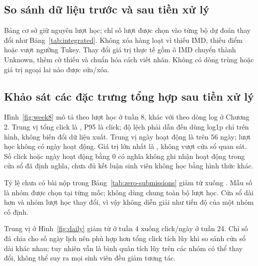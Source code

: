 \subsection{So sánh dữ liệu trước và sau tiền xử lý}
Bảng cơ sở giữ nguyên \NEnrollments{} lượt học; chỉ số lượt được chọn vào từng bộ dự đoán thay đổi như Bảng~\ref{tab:integrated}. Không xóa hàng loạt vì thiếu IMD, thiếu điểm hoặc vượt ngưỡng Tukey. Thay đổi giá trị thực tế gồm \NImdUnknown{} ô IMD chuyển thành Unknown, thêm cờ thiếu và chuẩn hóa \NImdLabels{} cách viết nhãn. Không có dòng trùng hoặc giá trị ngoại lai nào được sửa/xóa.

\subsection{Khảo sát các đặc trưng tổng hợp sau tiền xử lý}
Hình~\ref{fig:week8} mô tả theo lượt học ở tuần 8, khác với  theo dòng log ở Chương 2. Trung vị tổng click là \WeekEightClickMedian, P95 là \WeekEightClickPninetyfive{} click; độ lệch phải \WeekEightClickSkew{} dẫn đến dùng log1p chỉ trên hình, không biến đổi dữ liệu xuất.
Trung vị ngày hoạt động là \WeekEightActiveMedian{} trên 56 ngày; \WeekEightInactivePct{} lượt học không có ngày hoạt động. Giá trị lớn nhất là \WeekEightActiveMax{}, không vượt cửa sổ quan sát. Số click hoặc ngày hoạt động bằng 0 có nghĩa không ghi nhận hoạt động trong cửa sổ đã định nghĩa, chưa đủ kết luận sinh viên không học bằng hình thức khác.

\begin{table}[tbp]
\centering
\caption{Lượt học chưa có bài nộp đủ điều kiện tại từng mốc.}
\label{tab:zero-submissions}

\end{table}
Tỷ lệ chưa có bài nộp trong Bảng~\ref{tab:zero-submissions} giảm từ \PctZeroSubWeekFour{} xuống \PctZeroSubWeekTwentyFour. Mẫu số là nhóm được chọn tại từng mốc; không dùng chung toàn bộ \NEnrollments{} lượt học. Cửa sổ dài hơn và nhóm lượt học thay đổi, vì vậy không diễn giải như tiến độ của một nhóm cố định.

Trung vị  ở Hình~\ref{fig:daily} giảm từ \WeekFourDailyMedian{} ở tuần 4 xuống \WeekTwentyFourDailyMedian{} click/ngày ở tuần 24. Chỉ số đã chia cho số ngày lịch nên phù hợp hơn tổng click tích lũy khi so sánh cửa sổ dài khác nhau; tuy nhiên vẫn là bình quân tích lũy trên các nhóm có thể thay đổi, không thể suy ra mọi sinh viên đều giảm tương tác.

